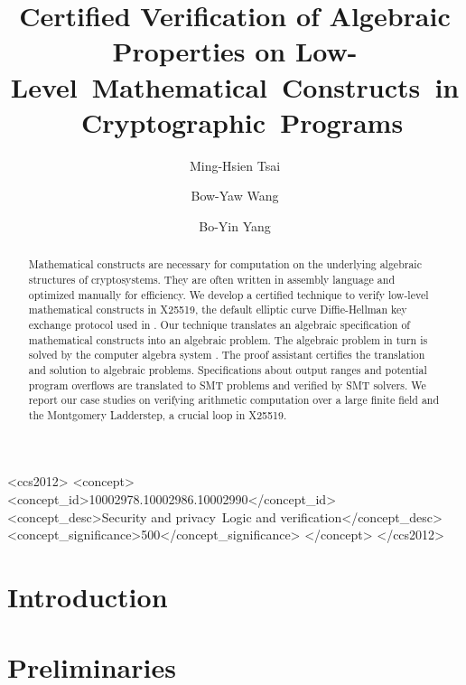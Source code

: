 \documentclass[sigconf, anonymous]{acmart}
\title{Certified Verification of Algebraic Properties on
Low- \mbox{Level Mathematical Constructs in Cryptographic Programs}}
\author{Ming-Hsien Tsai}
\affiliation{
  \institution{Academia Sinica}
  \streetaddress{Taipei, Taiwan}
}
\author{Bow-Yaw Wang}
\affiliation{
  \institution{Academia Sinica}
  \streetaddress{Taipei, Taiwan}
}
\author{Bo-Yin Yang}
\affiliation{
  \institution{Academia Sinica}
  \streetaddress{Taipei, Taiwan}
}
\author{\vspace*{-1.2cm}}
\affiliation{\vspace*{-1.2cm}\ }
\begin{document}

\begin{abstract}
  Mathematical constructs are necessary for computation on the
  underlying algebraic structures of cryptosystems. They are often
  written in assembly language and optimized manually for
  efficiency. We develop a certified technique to verify low-level mathematical
  constructs in X25519, the default elliptic curve Diffie-Hellman key
  exchange protocol used in \openssh. Our technique translates an
  algebraic specification of mathematical constructs into an algebraic
  problem. The algebraic
  problem in turn is solved by the computer algebra system \singular.
  The proof assistant
  \coq certifies the translation and solution to algebraic
  problems.
  Specifications about output ranges and potential program overflows are translated to SMT problems and verified by SMT solvers.
  We report our case studies on verifying
  arithmetic computation over a large finite field and
  the Montgomery Ladderstep, a crucial loop in X25519.
\end{abstract}

\begin{CCSXML}
<ccs2012>
<concept>
<concept_id>10002978.10002986.10002990</concept_id>
<concept_desc>Security and privacy~Logic and verification</concept_desc>
<concept_significance>500</concept_significance>
</concept>
</ccs2012>
\end{CCSXML}



\maketitle

\section{Introduction}
\label{section:introduction}



\section{Preliminaries}
\label{section:preliminaries}

\end{document}

